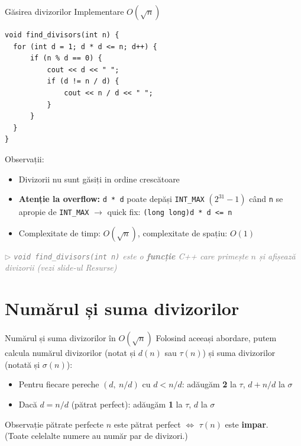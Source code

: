 \documentclass{beamer}
\newcommand{\beginnote}[1]{%
  \vfill
  {\footnotesize\textcolor{gray}{\textit{$\triangleright$ #1 (vezi slide-ul \emph{Resurse})}}}%
}
\begin{document}
\begin{frame}{Găsirea divizorilor \textemdash{} Implementare $O(\sqrt{n})$}
  \begin{lstlisting}
void find_divisors(int n) {
  for (int d = 1; d * d <= n; d++) {
      if (n % d == 0) {
          cout << d << " ";
          if (d != n / d) {
              cout << n / d << " ";
          }
      }
  }
}
  \end{lstlisting}
  \bigskip
  Observații:
  \begin{itemize}
    \item Divizorii nu sunt găsiți in ordine crescătoare
    \item \textbf{Atenție la overflow:} \lstinline|d * d| poate depăși \lstinline|INT_MAX| $(2^{31}-1)$ când \lstinline|n| se apropie de \lstinline|INT_MAX| $\rightarrow$ quick fix: \lstinline|(long long)d * d <= n|
    \item Complexitate de timp: $O(\sqrt{n})$, complexitate de spațiu: $O(1)$
  \end{itemize}
  \beginnote{\lstinline|void find_divisors(int n)| este o \textbf{funcție} C++ care primește $n$ și afișează divizorii}
\end{frame}

\section{Numărul și suma divizorilor}

\begin{frame}{Numărul și suma divizorilor în $O(\sqrt{n})$}
  Folosind aceeași abordare, putem calcula numărul divizorilor (notat și $d(n)$ sau $\tau(n)$) și suma divizorilor (notată și $\sigma(n)$):
  \bigskip
  \begin{itemize}
    \item Pentru fiecare pereche $(d,\ n/d)$ cu $d < n/d$: adăugăm \textbf{2} la $\tau$, $d + n/d$ la $\sigma$
    \item Dacă $d = n/d$ (pătrat perfect): adăugăm \textbf{1} la $\tau$, $d$ la $\sigma$
  \end{itemize}
  \bigskip
  \begin{block}{Observație \textemdash{} pătrate perfecte}
    $n$ este pătrat perfect $\Leftrightarrow$ $\tau(n)$ este \textbf{impar}. \\
    (Toate celelalte numere au număr par de divizori.)
  \end{block}
\end{frame}
\end{document}
